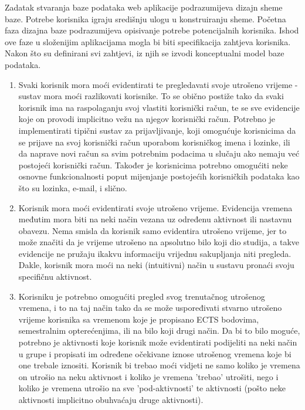\documentclass[times, utf8, zavrsni]{fer}
\begin{document}
Zadatak stvaranja baze podataka web aplikacije podrazumijeva dizajn sheme baze. Potrebe korisnika igraju središnju ulogu u konstruiranju sheme. Početna faza dizajna baze podrazumijeva opisivanje potrebe potencijalnih korisnika. Ishod ove faze u složenijim aplikacijama mogla bi biti specifikacija zahtjeva korisnika. Nakon što su definirani svi zahtjevi, iz njih se izvodi konceptualni model baze podataka.
\begin{enumerate}[leftmargin=*]
\item Svaki korisnik mora moći evidentirati te pregledavati svoje utrošeno vrijeme - sustav mora moći razlikovati korisnike. To se obično postiže tako da svaki korisnik ima na raspolaganju svoj vlastiti korisnički račun, te se sve evidencije koje on provodi implicitno vežu na njegov korisnički račun. Potrebno je implementirati tipični sustav za prijavljivanje, koji omogućuje korisnicima da se prijave na svoj korisnički račun uporabom korisničkog imena i lozinke, ili da naprave novi račun sa svim potrebnim podacima u slučaju ako nemaju već postojeći korisnički račun. Također je korisnicima potrebno omogućiti neke osnovne funkcionalnosti poput mijenjanje postojećih korisničkih podataka kao što su lozinka, e-mail, i slično.

\item Korisnik mora moći evidentirati svoje utrošeno vrijeme. Evidencija vremena međutim mora biti na neki način vezana uz određenu aktivnost ili nastavnu obavezu. Nema smisla da korisnik samo evidentira utrošeno vrijeme, jer to može značiti da je vrijeme utrošeno na apsolutno bilo koji dio studija, a takve evidencije ne pružaju ikakvu informaciju vrijednu sakupljanja niti pregleda. Dakle, korisnik mora moći na neki (intuitivni) način u sustavu pronaći svoju specifičnu aktivnost.

\item Korisniku je potrebno omogućiti pregled svog trenutačnog utrošenog vremena, i to na taj način tako da se može uspoređivati stvarno utrošeno vrijeme korisnika sa vremenom koje je propisano ECTS bodovima, semestralnim opterećenjima, ili na bilo koji drugi način. Da bi to bilo moguće, potrebno je aktivnosti koje korisnik može evidentirati podijeliti na neki način u grupe i propisati im određene očekivane iznose utrošenog vremena koje bi one trebale iznositi. Korisnik bi trebao moći vidjeti ne samo koliko je vremena on utrošio na neku aktivnost i koliko je vremena 'trebao' utrošiti, nego i koliko je vremena utrošio na sve 'pod-aktivnosti' te aktivnosti (pošto neke aktivnosti implicitno obuhvaćaju druge aktivnosti).
\end{enumerate}
\end{document}

